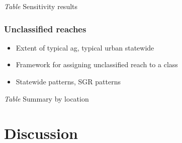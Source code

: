 \documentclass[]{article}
\begin{document}
\emph{Table} Sensitivity results

\subsubsection{Unclassified reaches}\label{unclassified-reaches-1}

\begin{itemize}
\item
  Extent of typical ag, typical urban statewide
\item
  Framework for assigning unclassified reach to a class
\item
  Statewide patterns, SGR patterns
\end{itemize}

\emph{Table} Summary by location

\section{Discussion}\label{discussion}
\end{document}
